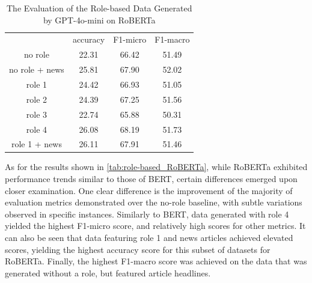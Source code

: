 \documentclass[manuscript]{clv3}
\begin{document}
\begin{table}
    \centering
    \begin{tabular}{cccc}
         &  accuracy&  F1-micro& F1-macro\\
         no role&  22.31&  66.42& 51.49\\
 no role + news& 25.81& 67.90&52.02\\
         role 1&  24.42&  66.93& 51.05\\
         role 2&  24.39&  67.25& 51.56\\
         role 3&  22.74&  65.88& 50.31\\
         role 4&  26.08&  68.19& 51.73\\
         role 1 + news&  26.11&  67.91& 51.46\\
    \end{tabular}
    \caption{The Evaluation of the Role-based Data Generated by GPT-4o-mini on RoBERTa}
    \label{tab:role-based_RoBERTa}
\end{table}

As for the results shown in \autoref{tab:role-based_RoBERTa}, while RoBERTa exhibited performance trends similar to those of BERT, certain differences emerged upon closer examination. One clear difference is the improvement of the majority of evaluation metrics demonstrated over the no-role baseline, with subtle variations observed in specific instances. Similarly to BERT, data generated with role 4 yielded the highest F1-micro score, and relatively high scores for other metrics. It can also be seen that data featuring role 1 and news articles achieved elevated scores, yielding the highest accuracy score for this subset of datasets for RoBERTa. Finally, the highest F1-macro score was achieved on the data that was generated without a role, but featured article headlines. 
\end{document}
